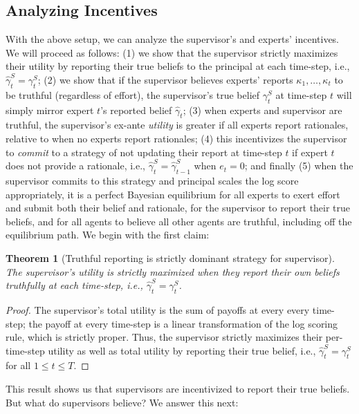 \documentclass{winnower}
\newtheorem{theorem}{Theorem}
\begin{document}
\subsection{Analyzing Incentives}

With the above setup, we can analyze the supervisor's and experts' incentives. We will proceed as follows: (1) we show that the supervisor strictly maximizes their utility by reporting their true beliefs to the principal at each time-step, i.e., $\hat{\gamma}_t^S = \gamma_t^S$; (2) we show that if the supervisor believes experts' reports $\kappa_1, \ldots, \kappa_t$ to be truthful (regardless of effort), the supervisor's true belief $\gamma_t^S$ at time-step $t$ will simply mirror expert $t$'s reported belief $\hat{\gamma}_t$; (3) when experts and supervisor are truthful, the supervisor's ex-ante \emph{utility} is greater if all experts report rationales, relative to when no experts report rationales; (4) this incentivizes the supervisor to \emph{commit} to a strategy of not updating their report at time-step $t$ if expert $t$ does not provide a rationale, i.e., $\hat{\gamma}_t^S = \hat{\gamma}_{t-1}^S$ when $e_t = 0$; and finally (5) when the supervisor commits to this strategy and principal scales the log score appropriately, it is a perfect Bayesian equilibrium for all experts to exert effort and submit both their belief and rationale, for the supervisor to report their true beliefs, and for all agents to believe all other agents are truthful, including off the equilibrium path. We begin with the first claim:

\begin{theorem}[Truthful reporting is strictly dominant strategy for supervisor]
    The supervisor's utility is strictly maximized when they report their own beliefs truthfully at each time-step, i.e., $\hat{\gamma}_t^{S} = \gamma_t^{S}$.
\end{theorem}

\begin{proof}
    The supervisor's total utility is the sum of payoffs at every every time-step; the payoff at every time-step is a linear transformation of the log scoring rule, which is strictly proper. Thus, the supervisor strictly maximizes their per-time-step utility as well as total utility by reporting their true belief, i.e., $\hat{\gamma}_t^S = \gamma_t^S$ for all $1 \leq t \leq T$. 
\end{proof}

This result shows us that supervisors are incentivized to report their true beliefs. But what do supervisors believe? We answer this next:
\end{document}
